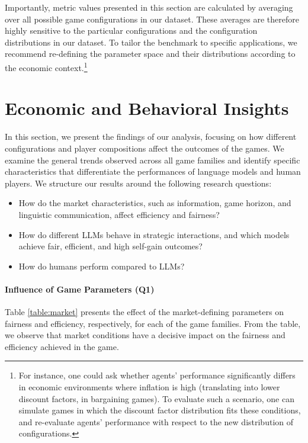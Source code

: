 Importantly, metric values presented in this section are calculated by averaging over all possible game configurations in our dataset. These averages are therefore highly sensitive to the particular configurations and the configuration distributions in our dataset. To tailor the benchmark to specific applications, we recommend re-defining the parameter space and their distributions according to the economic context.\footnote{For instance, one could ask whether agents' performance significantly differs in economic environments where inflation is high (translating into lower discount factors, in bargaining games). To evaluate such a scenario, one can simulate games in which the discount factor distribution fits these conditions, and re-evaluate agents' performance with respect to the new distribution of configurations.}

\section{Economic and Behavioral Insights}
\label{sec:EDA}

In this section, we present the findings of our analysis, focusing on how different configurations and player compositions affect the outcomes of the games. We examine the general trends observed across all game families and identify specific characteristics that differentiate the performances of language models and human players. We structure our results around the following research questions:
\begin{itemize}
    \item[(Q1)] How do the market characteristics, such as information, game horizon, and linguistic communication, affect efficiency and fairness?
    \item[(Q2)] How do different LLMs behave in strategic interactions, and which models achieve fair, efficient, and high self-gain outcomes?
    \item[(Q3)] How do humans perform compared to LLMs?
\end{itemize}



\paragraph{Influence of Game Parameters (Q1)} Table \ref{table:market} presents the effect of the market-defining parameters on fairness and efficiency, respectively, for each of the game families. From the table, we observe that market conditions have a decisive impact on the fairness and efficiency achieved in the game.

